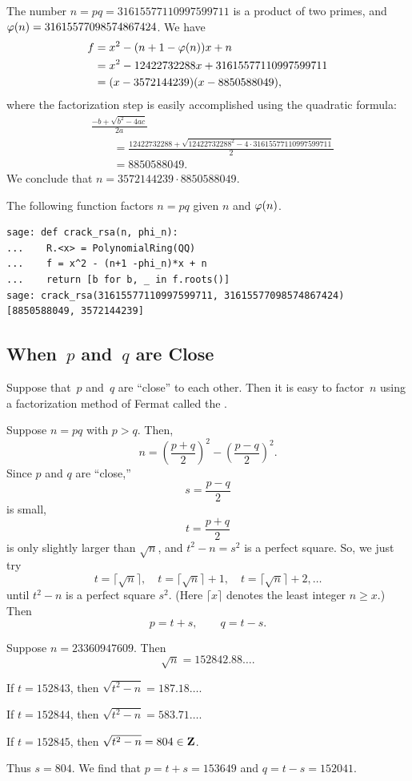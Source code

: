 \begin{example}
The number $n=pq=31615577110997599711$ is a product of two primes,
and $\varphi(n)= 31615577098574867424$.  We have
\begin{align*}
  f &= x^2 - (n+1-\varphi(n))x + n \\
    &= x^2 - 12422732288x + 31615577110997599711\\
    &= (x-3572144239)(x-8850588049),
\end{align*}
where the factorization
step is easily accomplished using the quadratic formula:
\begin{align*}
 & \frac{-b +\sqrt{b^2 - 4ac}}{2a} \\
 &\qquad=
   \frac{ 12422732288 + \sqrt{12422732288^2 - 4\cdot 31615577110997599711}}{2}\\
   &\qquad= 8850588049.
\end{align*}
We conclude that $n = 3572144239\cdot 8850588049$.
\end{example}
\begin{sg}
The following \sage function factors $n=pq$ given $n$ and $\varphi(n)$.
\begin{verbatim}
sage: def crack_rsa(n, phi_n):
...    R.<x> = PolynomialRing(QQ)
...    f = x^2 - (n+1 -phi_n)*x + n
...    return [b for b, _ in f.roots()]
sage: crack_rsa(31615577110997599711, 31615577098574867424)
[8850588049, 3572144239]
\end{verbatim}
\end{sg}

\subsection{When~$p$ and~$q$ are Close}
\label{sec:fermatcrack}
Suppose that~$p$ and~$q$ are ``close'' to each other.  Then
it is easy to factor~$n$ using a factorization
method of Fermat called the .

Suppose $n=pq$ with $p>q$. Then,
$$n = \left(\frac{p+q}{2}\right)^2 -
      \left(\frac{p-q}{2}\right)^2.$$
Since $p$ and $q$ are ``close,''
$$
  s = \frac{p-q}{2}
$$
is small,
$$
  t = \frac{p+q}{2}
$$
is only slightly larger than $\sqrt{n}$,
and $t^2-n=s^2$ is a perfect square.
So, we just try
$$
  t = \lceil\sqrt{n}\rceil, \quad t=\lceil\sqrt{n}\rceil+1,
      \quad t=\lceil\sqrt{n}\rceil+2, \ldots
$$
until $t^2-n$ is a perfect square $s^2$.  (Here $\lceil x\rceil$
denotes the least integer $n\geq x$.)
Then
$$
   p = t+s,\qquad q=t-s.
$$
\begin{example}
Suppose $n=23360947609$.
Then
$$\sqrt{n} = 152842.88\ldots.$$

If $t=152843$, then $\sqrt{t^2-n} = 187.18\ldots$.

If $t=152844$, then $\sqrt{t^2-n} = 583.71\ldots$.

If $t=152845$, then $\sqrt{t^2-n} = 804\in\mathbf{Z}$.

Thus $s=804$.  We find that $p=t+s=153649$ and $q=t-s=152041$.
\end{example}

